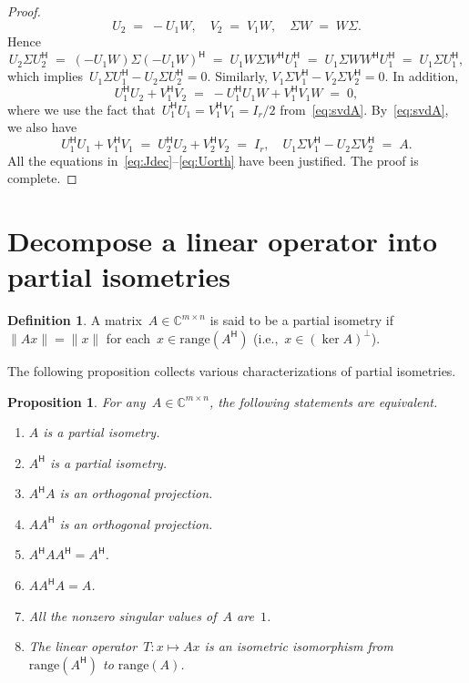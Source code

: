 \documentclass[11pt,a4paper]{article}
\newtheorem{proposition}{Proposition}%
\theoremstyle{definition}
\newtheorem{definition}{Definition}%
\def\CC{\mathbb{C}}
\newcommand{\hmt}{{\scriptscriptstyle{{\mathsf{H}}}}}
\newcommand{\range}{\mathrm{range}}
\newcommand{\ie}{{i.e.}}
\begin{document}
\begin{proof}
\begin{equation*}
    U_2 \;=\; -U_1W, \quad V_2 \;=\; V_1W, \quad \Sigma W \;=\; W\Sigma.
  \end{equation*}
  Hence
  \begin{equation*}
    U_2\Sigma U_2^\hmt \;=\; (-U_1W)\Sigma (-U_1W)^\hmt \;=\; U_1W\Sigma W^\hmt U_1^\hmt \;=\; U_1 \Sigma
    WW^\hmt U_1^\hmt \;=\; U_1\Sigma U_1^\hmt, 
  \end{equation*}
  which implies~$U_1\Sigma U_1^\hmt - U_2\Sigma U_2^\hmt = 0$. Similarly, $V_1\Sigma V_1^\hmt
  - V_2\Sigma V_2^\hmt = 0$. In addition,
  \begin{equation*}
    U_1^\hmt U_2 + V_1^\hmt V_2 \;=\; -U_1^\hmt U_1W + V_1^\hmt V_1W \;=\; 0,
  \end{equation*}
  where we use the fact that~$U_1^\hmt U_1 = V_1^\hmt V_1 = I_r/2$ from~\eqref{eq:svdA}.
  By~\eqref{eq:svdA}, we also have
  \begin{equation*}
    U_1^\hmt U_1 + V_1^\hmt V_1 \;=\;  U_2^\hmt U_2 + V_2^\hmt V_2 \;=\; I_r, \quad U_1\Sigma V_1^\hmt
    - U_2\Sigma V_2^\hmt \;=\; A. 
  \end{equation*}
  All the equations in~\eqref{eq:Jdec}--\eqref{eq:Uorth} have been justified. The proof is
  complete.
\end{proof}



\section{Decompose a linear operator into partial isometries~\cite{Koranyi_2001}}

\begin{definition}
  A matrix~$A\in\CC^{m\times n}$ is said to be a partial isometry if~$\|Ax\|=\|x\|$ for
  each~$x\in \range(A^\hmt)$ (\ie,~$x\in (\ker A)^{\perp}$).
\end{definition}

The following proposition collects various characterizations of partial isometries. 

\begin{proposition}
  \label{prop:piso}
  For any~$A\in\CC^{m\times n}$, the following statements are equivalent. 
  \begin{enumerate}[leftmargin=1.5em]
    \item \label{it:ai} $A$ is a partial isometry. 
    \item \label{it:ahi} $A^\hmt$ is a partial isometry.
    \item \label{it:aha} $A^\hmt A$ is an orthogonal projection. 
    \item \label{it:aah} $AA^\hmt$ is an orthogonal projection.
    \item \label{it:ahaah} $A^\hmt A A^\hmt = A^\hmt$. 
    \item \label{it:aaha} $A A^\hmt A = A$. 
    \item \label{it:sina} All the nonzero singular values of~$A$ are~$1$. 
    \item \label{it:iso} The linear operator~$T\mathrel{:} x \mapsto Ax$ is an isometric isomorphism from~$\range(A^\hmt)$ to $\range(A)$.
  \end{enumerate}
\end{proposition}
\end{document}

